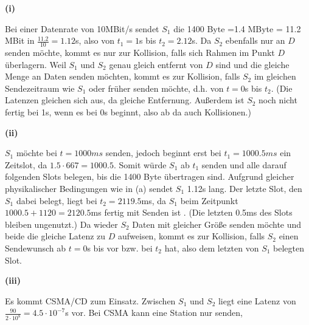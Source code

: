 \documentclass{../exercisesheet}
\begin{document}
\begin{exercise}{6}
\begin{subexercise}
\textbf{(i)}
\begin{adjustwidth}{2em}{0em}\vspace{-\baselineskip}
	Bei einer Datenrate von 10MBit/s sendet $S_1$ die 1400 Byte =1.4 MByte = 11.2 MBit in $\frac{11.2}{10}=1.12$s, also von $t_1=1$s bis $t_2=2.12$s. Da $S_2$ ebenfalls nur an
	$D$ senden möchte, kommt es nur zur Kollision, falls sich Rahmen im Punkt $D$ überlagern. Weil $S_1$ und $S_2$ genau gleich entfernt von $D$ sind und die gleiche Menge an Daten
 	senden möchten, kommt es zur Kollision, falls $S_2$ im gleichen Sendezeitraum wie $S_1$ oder früher senden möchte, d.h. von $t=0$s bis $t_2$. (Die Latenzen gleichen sich aus, da
	gleiche Entfernung. Außerdem ist $S_2$ noch nicht fertig bei 1s, wenn es bei 0s beginnt, also ab da auch Kollisionen.)\\
\end{adjustwidth}
\textbf{(ii)}
\begin{adjustwidth}{2em}{0em}\vspace{-\baselineskip}
	$S_1$ möchte bei $t=1000ms$ senden, jedoch beginnt erst bei $t_1=1000.5ms$ ein Zeitslot, da $1.5 \cdot 667 = 1000.5$. Somit würde $S_1$ ab $t_1$ senden und alle
	darauf folgenden Slots belegen, bis die 1400 Byte übertragen sind. Aufgrund gleicher physikalischer Bedingungen wie in (a) sendet $S_1$ 1.12s lang. Der letzte Slot,
	den $S_1$ dabei belegt, liegt bei $t_2=2119.5$ms, da $S_1$ beim Zeitpunkt $1000.5+1120=2120.5$ms fertig mit Senden ist . (Die letzten 0.5ms des Slots bleiben ungenutzt.) Da
	wieder $S_2$ Daten mit gleicher Größe senden möchte und beide die gleiche Latenz zu $D$ aufweisen, kommt es zur Kollision, falls $S_2$ einen Sendewunsch 
	ab $t=0$s bis
	 vor bzw. bei $t_2$ hat, also dem letzten von $S_1$ belegten Slot.\\ 
\end{adjustwidth}
\textbf{(iii)}
\begin{adjustwidth}{2em}{0em}\vspace{-\baselineskip}
	Es kommt CSMA/CD zum Einsatz. Zwischen $S_1$ und $S_2$ liegt eine Latenz von $\frac{90}{2 \cdot 10^8}= 4.5\cdot 10^{-7}$s vor. Bei CSMA kann eine Station nur senden, 

\end{adjustwidth}
\end{subexercise}
\end{exercise}
\end{document}
